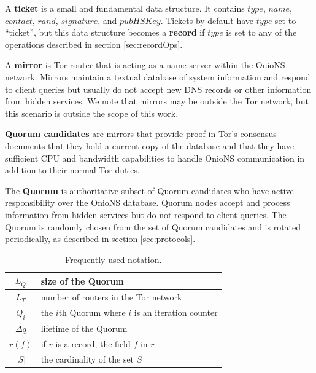 \documentclass[USenglish,oneside,twocolumn]{article}
\begin{document}
A \textbf{ticket} is a small and fundamental data structure. It contains $ \mathit{type} $, $ \mathit{name} $, $ \mathit{contact} $, $ \mathit{rand} $, $ \mathit{signature} $, and $ \mathit{pubHSKey} $. Tickets by default have $ \mathit{type} $ set to ``ticket'', but this data structure becomes a \textbf{record} if $ \mathit{type} $ is set to any of the operations described in section \ref{sec:recordOps}.

A \textbf{mirror} is Tor router that is acting as a name server within the OnioNS network. Mirrors maintain a textual database of system information and respond to client queries but usually do not accept new DNS records or other information from hidden services. We note that mirrors may be outside the Tor network, but this scenario is outside the scope of this work.

\textbf{Quorum candidates} are mirrors that provide proof in Tor's consensus documents that they hold a current copy of the database and that they have sufficient CPU and bandwidth capabilities to handle OnioNS communication in addition to their normal Tor duties.

The \textbf{Quorum} is authoritative subset of Quorum candidates who have active responsibility over the OnioNS database. Quorum nodes accept and process information from hidden services but do not respond to client queries. The Quorum is randomly chosen from the set of Quorum candidates and is rotated periodically, as described in section \ref{sec:protocols}.

\begin{center}
	\vspace{0mm}
	\begin{table}[htp]
		\hspace{5 mm}
  		\begin{tabular}{ | c | l | }
			$ L_{Q} $ & size of the Quorum \\ \hline
			$ L_{T} $ & number of routers in the Tor network \\ \hline
			$ Q_{i} $ & the $ i $th Quorum where $ i $ is an iteration counter \\ \hline
			$ \Delta q $ & lifetime of the Quorum \\ \hline
			$ r(f) $ & if $ r $ is a record, the field $ f $ in $ r $ \\ \hline
			$ \left\vert{S}\right\vert $ & the cardinality of the set $ S $ \\
		\end{tabular}
		\caption{Frequently used notation.}
	\end{table}
	\vspace{-12mm}
\end{center}
\end{document}
